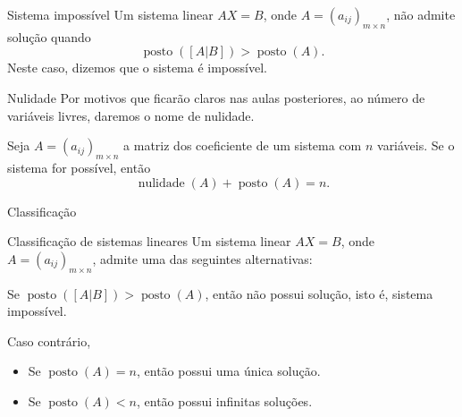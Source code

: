 \begin{frame}[label=sistemas]

\begin{block}{Sistema impossível}
Um sistema linear $AX=B$, onde $A=(a_{ij})_{m\times n}$, {\color{red} não admite solução} quando
\[\operatorname{posto}([A|B])>\operatorname{posto}(A).\]
Neste caso, dizemos que {\color{blue}o sistema é impossível}.
\end{block}

\begin{block}{Nulidade}
Por motivos que ficarão claros nas aulas posteriores, ao número de variáveis livres, daremos o nome de {\color{blue} nulidade}.
\end{block}

\begin{teo}
Seja $A=(a_{ij})_{m\times n}$ a matriz dos coeficiente de um sistema com $n$ variáveis. {\color{blue}Se o sistema for possível}, então
\[\operatorname{nulidade}(A)+\operatorname{posto}(A)=n.\]
\end{teo}

%
%

\end{frame}

\begin{frame}[label=sistemas]{Classificação}
\begin{block}{Classificação de sistemas lineares}
Um sistema linear $AX=B$, onde $A=(a_{ij})_{m\times n}$, admite uma das seguintes alternativas:
\medskip

Se $\operatorname{posto}([A|B])>\operatorname{posto}(A)$, então {\color{red} não possui solução}, isto é, sistema impossível.

\medskip
Caso contrário, 
\begin{itemize}
\item Se $\operatorname{posto}(A)=n$, então possui {\color{blue}uma única} solução.

\item Se $\operatorname{posto}(A)<n$, então possui {\color{blue}infinitas} soluções.
\end{itemize}
\end{block}
\end{frame}



